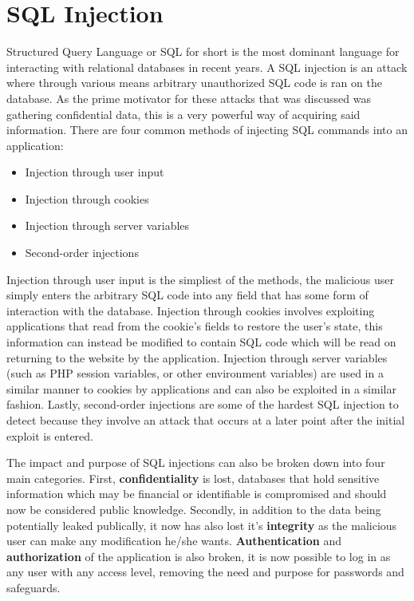 \section{SQL Injection}\label{sec:sqliExplanation}
Structured Query Language or SQL for short is the most dominant language for interacting with relational databases in recent years.  A SQL injection is an attack where through various means arbitrary unauthorized SQL code is ran on the database.  As the prime motivator for these attacks that was discussed was gathering confidential data, this is a very powerful way of acquiring said information. \cite{aSurveyOnWeb}  There are four common methods of injecting SQL commands into an application:

\begin{itemize}
	\item Injection through user input
	\item Injection through cookies
	\item Injection through server variables
	\item Second-order injections
\end{itemize}

Injection through user input is the simpliest of the methods, the malicious user simply enters the arbitrary SQL code into any field that has some form of interaction with the database.  Injection through cookies involves exploiting applications that read from the cookie's fields to restore the user's state, this information can instead be modified to contain SQL code which will be read on returning to the website by the application.  Injection through server variables (such as PHP session variables, or other environment variables) are used in a similar manner to cookies by applications and can also be exploited in a similar fashion.  Lastly, second-order injections are some of the hardest SQL injection to detect because they involve an attack that occurs at a later point after the initial exploit is entered. \cite{aClassificationOfSQL}

The impact and purpose of SQL injections can also be broken down into four main categories.  First, \textbf{confidentiality} is lost, databases that hold sensitive information which may be financial or identifiable is compromised and should now be considered public knowledge.  Secondly, in addition to the data being potentially leaked publically, it now has also lost it's \textbf{integrity} as the malicious user can make any modification he/she wants.  \textbf{Authentication} and \textbf{authorization} of the application is also broken, it is now possible to log in as any user with any access level, removing the need and purpose for passwords and safeguards.

